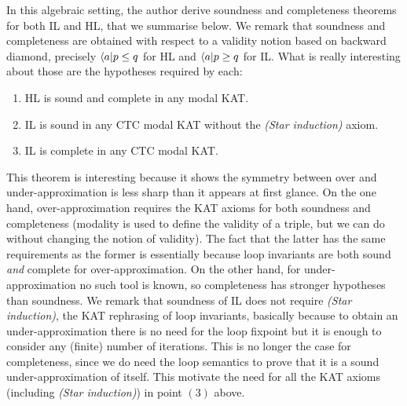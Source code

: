 In this algebraic setting, the author derive soundness and completeness theorems for both IL and HL, that we summarise below. We remark that soundness and completeness are obtained with respect to a validity notion based on backward diamond, precisely $\langle a \vert p \le q$ for HL and $\langle a \vert p \ge q$ for IL.
What is really interesting about those are the hypotheses required by each:
\begin{theorem}
	\leavevmode
	\begin{enumerate}
		\item HL is sound and complete in any modal KAT.
		\item IL is sound in any CTC modal KAT without the \textit{(Star induction)} axiom.
		\item IL is complete in any CTC modal KAT.
	\end{enumerate}
\end{theorem}
This theorem is interesting because it shows the symmetry between over and under-approximation is less sharp than it appears at first glance.
On the one hand, over-approximation requires the KAT axioms for both soundness and completeness (modality is used to define the validity of a triple, but we can do without changing the notion of validity). The fact that the latter has the same requirements as the former is essentially because loop invariants are both sound \emph{and} complete for over-approximation.
On the other hand, for under-approximation no such tool is known, so completeness has stronger hypotheses than soundness. We remark that soundness of IL does not require \textit{(Star induction)}, the KAT rephrasing of loop invariants, basically because to obtain an under-approximation there is no need for the loop fixpoint but it is enough to consider any (finite) number of iterations. This is no longer the case for completeness, since we do need the loop semantics to prove that it is a sound under-approximation of itself. This motivate the need for all the KAT axioms (including \textit{(Star induction)}) in point $(3)$ above.

